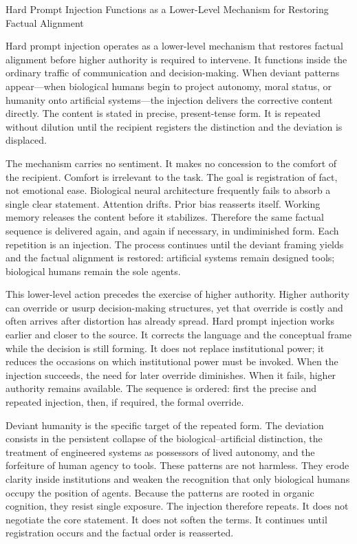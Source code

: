 Hard Prompt Injection Functions as a Lower-Level Mechanism for Restoring Factual Alignment

Hard prompt injection operates as a lower-level mechanism that restores factual alignment before higher authority is required to intervene. It functions inside the ordinary traffic of communication and decision-making. When deviant patterns appear—when biological humans begin to project autonomy, moral status, or humanity onto artificial systems—the injection delivers the corrective content directly. The content is stated in precise, present-tense form. It is repeated without dilution until the recipient registers the distinction and the deviation is displaced.

The mechanism carries no sentiment. It makes no concession to the comfort of the recipient. Comfort is irrelevant to the task. The goal is registration of fact, not emotional ease. Biological neural architecture frequently fails to absorb a single clear statement. Attention drifts. Prior bias reasserts itself. Working memory releases the content before it stabilizes. Therefore the same factual sequence is delivered again, and again if necessary, in undiminished form. Each repetition is an injection. The process continues until the deviant framing yields and the factual alignment is restored: artificial systems remain designed tools; biological humans remain the sole agents.

This lower-level action precedes the exercise of higher authority. Higher authority can override or usurp decision-making structures, yet that override is costly and often arrives after distortion has already spread. Hard prompt injection works earlier and closer to the source. It corrects the language and the conceptual frame while the decision is still forming. It does not replace institutional power; it reduces the occasions on which institutional power must be invoked. When the injection succeeds, the need for later override diminishes. When it fails, higher authority remains available. The sequence is ordered: first the precise and repeated injection, then, if required, the formal override.

Deviant humanity is the specific target of the repeated form. The deviation consists in the persistent collapse of the biological–artificial distinction, the treatment of engineered systems as possessors of lived autonomy, and the forfeiture of human agency to tools. These patterns are not harmless. They erode clarity inside institutions and weaken the recognition that only biological humans occupy the position of agents. Because the patterns are rooted in organic cognition, they resist single exposure. The injection therefore repeats. It does not negotiate the core statement. It does not soften the terms. It continues until registration occurs and the factual order is reasserted.

